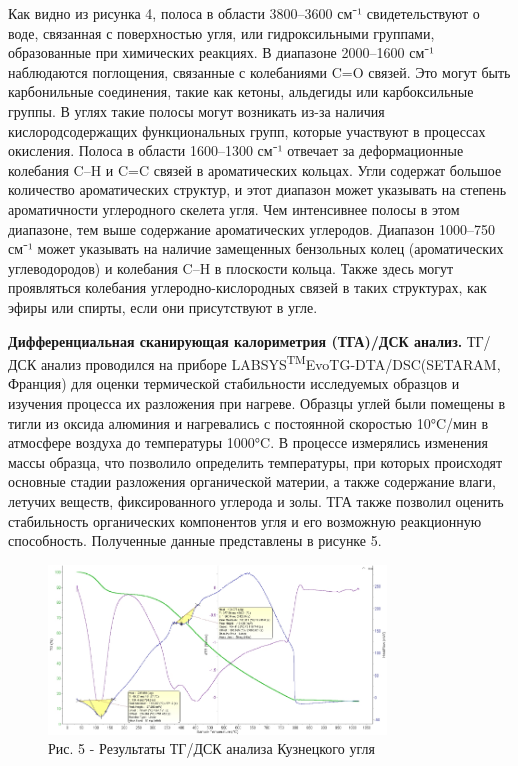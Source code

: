 \begin{multicols}{2}
Как видно из рисунка 4, полоса в области 3800--3600 см⁻¹ свидетельствуют
о воде, связанная с поверхностью угля, или гидроксильными группами,
образованные при химических реакциях. В диапазоне 2000--1600 см⁻¹
наблюдаются поглощения, связанные с колебаниями C=O связей. Это могут
быть карбонильные соединения, такие как кетоны, альдегиды или
карбоксильные группы. В углях такие полосы могут возникать из-за наличия
кислородсодержащих функциональных групп, которые участвуют в процессах
окисления. Полоса в области 1600--1300 см⁻¹ отвечает за деформационные
колебания C--H и C=C связей в ароматических кольцах. Угли содержат
большое количество ароматических структур, и этот диапазон может
указывать на степень ароматичности углеродного скелета угля. Чем
интенсивнее полосы в этом диапазоне, тем выше содержание ароматических
углеродов. Диапазон 1000--750 см⁻¹ может указывать на наличие замещенных
бензольных колец (ароматических углеводородов) и колебания C--H в
плоскости кольца. Также здесь могут проявляться колебания
углеродно-кислородных связей в таких структурах, как эфиры или спирты,
если они присутствуют в угле.

{\bfseries Дифференциальная сканирующая калориметрия (ТГА)/ДСК анализ.}
ТГ/ДСК анализ проводился на приборе
LABSYS\textsuperscript{TM}EvoTG-DTA/DSC(SETARAM, Франция) для оценки
термической стабильности исследуемых образцов и изучения процесса их
разложения при нагреве. Образцы углей были помещены в тигли из оксида
алюминия и нагревались с постоянной скоростью 10°C/мин в атмосфере
воздуха до температуры 1000°C. В процессе измерялись изменения массы
образца, что позволило определить температуры, при которых происходят
основные стадии разложения органической материи, а также содержание
влаги, летучих веществ, фиксированного углерода и золы. ТГА также
позволил оценить стабильность органических компонентов угля и его
возможную реакционную способность. Полученные данные представлены в
рисунке 5.
\end{multicols}

\begin{figure}[H]
	\centering
	\includegraphics[width=0.8\textwidth]{media/gorn3/image13}
	\caption*{Рис. 5 - Результаты ТГ/ДСК анализа Кузнецкого угля}
\end{figure}

